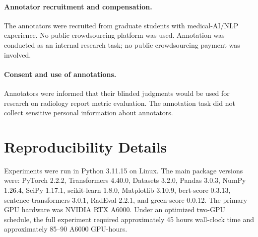 \documentclass[11pt]{article}
\begin{document}
\paragraph{Annotator recruitment and compensation.}
The annotators were recruited from graduate students with medical-AI/NLP experience. No public crowdsourcing platform was used. Annotation was conducted as an internal research task; no public crowdsourcing payment was involved.

\paragraph{Consent and use of annotations.}
Annotators were informed that their blinded judgments would be used for research on radiology report metric evaluation. The annotation task did not collect sensitive personal information about annotators.


\section{Reproducibility Details}
\label{app:repro}

Experiments were run in Python 3.11.15 on Linux. 
The main package versions were: PyTorch 2.2.2, Transformers 4.40.0, Datasets 3.2.0, Pandas 3.0.3, NumPy 1.26.4, SciPy 1.17.1, scikit-learn 1.8.0, Matplotlib 3.10.9, bert-score 0.3.13, sentence-transformers 3.0.1, RadEval 2.2.1, and green-score 0.0.12. 
The primary GPU hardware was NVIDIA RTX A6000. 
Under an optimized two-GPU schedule, the full experiment required approximately 45 hours wall-clock time and approximately 85--90 A6000 GPU-hours.
\end{document}
